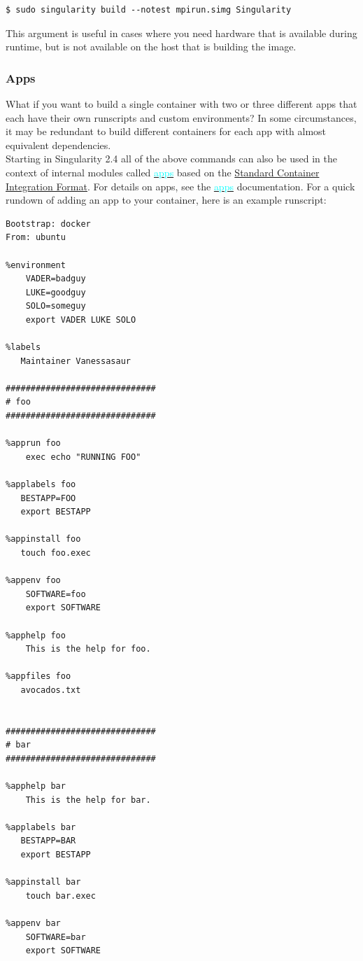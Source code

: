 \documentclass[a4paper]{article}
\begin{document}
\begin{lstlisting}[frame=single] 
$ sudo singularity build --notest mpirun.simg Singularity
\end{lstlisting}

This argument is useful in cases where you need hardware that is available during runtime, but is not available on the host that is building the image.

\subsubsection{Apps}

What if you want to build a single container with two or three different apps that each have their own runscripts and custom environments? In some circumstances, it may be redundant to build different containers for each app with almost equivalent dependencies.\\[0.1in]

Starting in Singularity 2.4 all of the above commands can also be used in the context of internal modules called \hyperref[sec:scifapps]{{\textcolor{cyan}{apps}}}  based on the \href{https://sci-f.github.io/}{Standard Container Integration Format}. For details on apps, see the \hyperref[sec:scifapps]{{\textcolor{cyan}{apps}}} documentation. For a quick rundown of adding an app to your container, here is an example runscript:

\begin{lstlisting}[frame=single] 
Bootstrap: docker
From: ubuntu

%environment
    VADER=badguy
    LUKE=goodguy
    SOLO=someguy
    export VADER LUKE SOLO

%labels
   Maintainer Vanessasaur

##############################
# foo
##############################

%apprun foo
    exec echo "RUNNING FOO"

%applabels foo
   BESTAPP=FOO
   export BESTAPP

%appinstall foo
   touch foo.exec

%appenv foo
    SOFTWARE=foo
    export SOFTWARE

%apphelp foo
    This is the help for foo.

%appfiles foo
   avocados.txt


##############################
# bar
##############################

%apphelp bar
    This is the help for bar.

%applabels bar
   BESTAPP=BAR
   export BESTAPP

%appinstall bar
    touch bar.exec

%appenv bar
    SOFTWARE=bar
    export SOFTWARE
\end{lstlisting}
\end{document}
